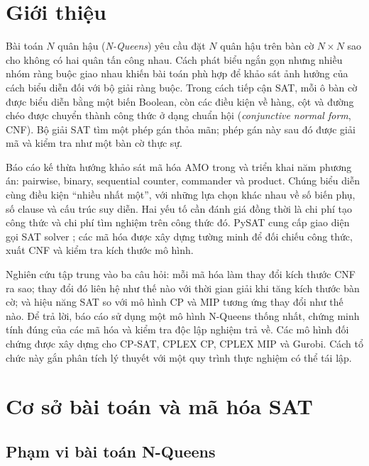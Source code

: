 
\section{Giới thiệu}
\label{sec:theory-introduction}

Bài toán $N$ quân hậu (\emph{N-Queens}) yêu cầu đặt $N$ quân hậu trên bàn cờ
$N\times N$ sao cho không có hai quân tấn công nhau. Cách phát biểu ngắn gọn
nhưng nhiều nhóm ràng buộc giao nhau khiến bài toán phù hợp để khảo sát ảnh
hưởng của cách biểu diễn đối với bộ giải ràng buộc. Trong cách tiếp cận SAT,
mỗi ô bàn cờ được biểu diễn bằng một biến Boolean, còn các điều kiện về hàng,
cột và đường chéo được chuyển thành công thức ở dạng chuẩn hội
(\emph{conjunctive normal form}, CNF). Bộ giải SAT tìm một phép gán thỏa mãn;
phép gán này sau đó được giải mã và kiểm tra như một bàn cờ thực sự.

Báo cáo kế thừa hướng khảo sát mã hóa AMO trong \cite{bach2024,module3}
và triển khai năm phương án: pairwise, binary, sequential counter,
commander và product. Chúng biểu diễn cùng điều kiện ``nhiều nhất một'',
với những lựa chọn khác nhau về số biến phụ, số clause và cấu trúc suy
diễn. Hai yếu tố cần đánh giá đồng thời là chi phí tạo công thức và chi
phí tìm nghiệm trên công thức đó. PySAT cung cấp giao diện gọi SAT
solver \cite{pysat}; các mã hóa được xây dựng tường minh để đối chiếu
công thức, xuất CNF và kiểm tra kích thước mô hình.

Nghiên cứu tập trung vào ba câu hỏi: mỗi mã hóa làm thay đổi kích thước
CNF ra sao; thay đổi đó liên hệ như thế nào với thời gian giải khi tăng
kích thước bàn cờ; và hiệu năng SAT so với mô hình CP và MIP tương ứng
thay đổi như thế nào. Để trả lời, báo cáo sử dụng một mô hình N-Queens
thống nhất, chứng minh tính đúng của các mã hóa và kiểm tra độc lập
nghiệm trả về. Các mô hình đối chứng được xây dựng cho CP-SAT, CPLEX
CP, CPLEX MIP và Gurobi. Cách tổ chức này gắn phân tích lý thuyết với
một quy trình thực nghiệm có thể tái lập.

\section{Cơ sở bài toán và mã hóa SAT}
\label{sec:theory-background}

\subsection{Phạm vi bài toán N-Queens}

